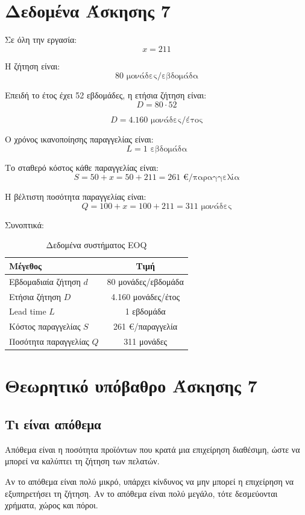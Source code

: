 \documentclass[12pt,a4paper]{article}
\begin{document}
\section{Δεδομένα Άσκησης 7}

Σε όλη την εργασία:
\[
x=211
\]

Η ζήτηση είναι:
\[
80 \text{ μονάδες/εβδομάδα}
\]

Επειδή το έτος έχει 52 εβδομάδες, η ετήσια ζήτηση είναι:
\[
D=80\cdot52
\]

\[
D=4.160 \text{ μονάδες/έτος}
\]

Ο χρόνος ικανοποίησης παραγγελίας είναι:
\[
L=1 \text{ εβδομάδα}
\]

Το σταθερό κόστος κάθε παραγγελίας είναι:
\[
S=50+x=50+211=261 \text{ €/παραγγελία}
\]

Η βέλτιστη ποσότητα παραγγελίας είναι:
\[
Q=100+x=100+211=311 \text{ μονάδες}
\]

Συνοπτικά:

\begin{table}[H]
\centering
\caption{Δεδομένα συστήματος EOQ}
\begin{tabular}{lc}
\toprule
\textbf{Μέγεθος} & \textbf{Τιμή} \\
\midrule
Εβδομαδιαία ζήτηση \(d\) & 80 μονάδες/εβδομάδα \\
Ετήσια ζήτηση \(D\) & 4.160 μονάδες/έτος \\
Lead time \(L\) & 1 εβδομάδα \\
Κόστος παραγγελίας \(S\) & 261 €/παραγγελία \\
Ποσότητα παραγγελίας \(Q\) & 311 μονάδες \\
\bottomrule
\end{tabular}
\end{table}

\section{Θεωρητικό υπόβαθρο Άσκησης 7}

\subsection{Τι είναι απόθεμα}

Απόθεμα είναι η ποσότητα προϊόντων που κρατά μια επιχείρηση διαθέσιμη, ώστε να μπορεί να καλύπτει τη ζήτηση των πελατών.

Αν το απόθεμα είναι πολύ μικρό, υπάρχει κίνδυνος να μην μπορεί η επιχείρηση να εξυπηρετήσει τη ζήτηση. Αν το απόθεμα είναι πολύ μεγάλο, τότε δεσμεύονται χρήματα, χώρος και πόροι.
\end{document}
